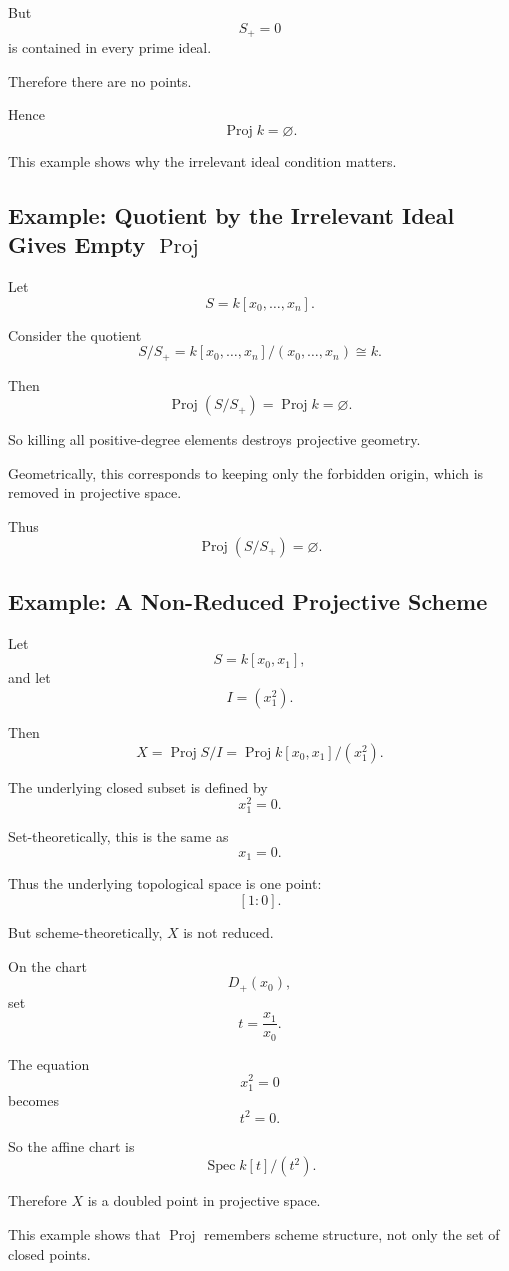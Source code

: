 \documentclass[12pt,a4paper]{article}
\DeclareMathOperator{\Spec}{Spec}
\DeclareMathOperator{\Proj}{Proj}
\theoremstyle{notespace}
\begin{document}
But
\[
S_+=0
\]
is contained in every prime ideal.

Therefore there are no points.

Hence
\[
\boxed{
	\Proj k=\varnothing.
}
\]

This example shows why the irrelevant ideal condition matters.

\subsection{Example: Quotient by the Irrelevant Ideal Gives Empty \texorpdfstring{$\Proj$}{Proj}}

Let
\[
S=k[x_0,\dots,x_n].
\]

Consider the quotient
\[
S/S_+
=
k[x_0,\dots,x_n]/(x_0,\dots,x_n)
\cong k.
\]

Then
\[
\Proj(S/S_+)
=
\Proj k
=
\varnothing.
\]

So killing all positive-degree elements destroys projective geometry.

Geometrically, this corresponds to keeping only the forbidden origin, which is removed in projective space.

Thus
\[
\boxed{
	\Proj(S/S_+)=\varnothing.
}
\]

\subsection{Example: A Non-Reduced Projective Scheme}

Let
\[
S=k[x_0,x_1],
\]
and let
\[
I=(x_1^2).
\]

Then
\[
X=\Proj S/I
=
\Proj k[x_0,x_1]/(x_1^2).
\]

The underlying closed subset is defined by
\[
x_1^2=0.
\]

Set-theoretically, this is the same as
\[
x_1=0.
\]

Thus the underlying topological space is one point:
\[
[1:0].
\]

But scheme-theoretically, \(X\) is not reduced.

On the chart
\[
D_+(x_0),
\]
set
\[
t=\frac{x_1}{x_0}.
\]

The equation
\[
x_1^2=0
\]
becomes
\[
t^2=0.
\]

So the affine chart is
\[
\Spec k[t]/(t^2).
\]

Therefore \(X\) is a doubled point in projective space.

This example shows that \(\Proj\) remembers scheme structure, not only the set of closed points.
\end{document}
